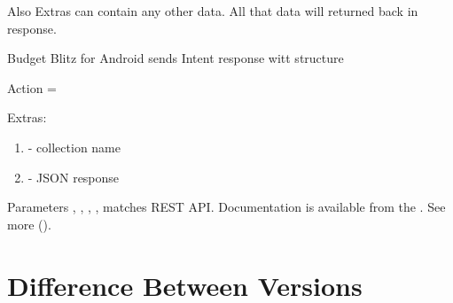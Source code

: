 \documentclass[a4paper,10pt,english]{sphinxmanual}
\begin{document}
Also Extras can contain any other data. All that data will returned back in response.

Budget Blitz for Android sends Intent response witt structure

Action = 

Extras:
\begin{enumerate}
\def\theenumi{\arabic{enumi}}
\def\labelenumi{\theenumi .}
\makeatletter\def\p@enumii{\p@enumi \theenumi .}\makeatother
\item {} 
 - collection name

\item {} 
 - JSON response

\end{enumerate}

Parameters , , , ,  matches REST API. Documentation is available from the .
See more {\hyperref[\detokenize{api:sub-chapter-rest-api}]{}} ().


\chapter{Difference Between Versions}
\label{\detokenize{versions:difference-between-versions}}\label{\detokenize{versions:chapter-versions}}\label{\detokenize{versions::doc}}
\end{document}
